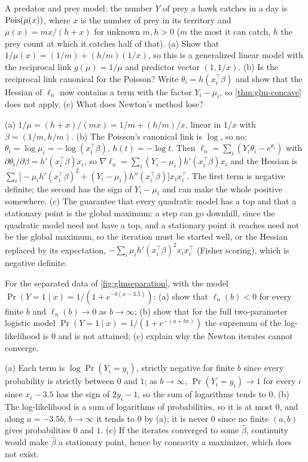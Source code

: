 \begin{exercise}
\label{ex:glm-predator}
A predator and prey model: the number $Y$ of prey a hawk catches in a day is $\text{Pois}(\mu(x))$, where $x$ is the number of prey in its territory and $\mu(x) = mx/(h + x)$ for unknown $m, h > 0$ ($m$ the most it can catch, $h$ the prey count at which it catches half of that). (a) Show that $1/\mu(x) = (1/m) + (h/m)(1/x)$, so this is a generalized linear model with the reciprocal link $g(\mu) = 1/\mu$ and predictor vector $(1, 1/x)$. (b) Is the reciprocal link canonical for the Poisson? Write $\theta_i = h(x_i^\top\beta)$ and show that the Hessian of $\ell_n$ now contains a term with the factor $Y_i - \mu_i$, so \cref{thm:glm-concave} does not apply. (c) What does Newton's method lose?
\end{exercise}
\begin{solution}
(a) $1/\mu = (h + x)/(mx) = 1/m + (h/m)/x$, linear in $1/x$ with $\beta = (1/m, h/m)$. (b) The Poisson's canonical link is $\log$, so no: $\theta_i = \log\mu_i = -\log(x_i^\top\beta)$, $h(t) = -\log t$. Then $\ell_n = \sum_i(Y_i\theta_i - e^{\theta_i})$ with $\partial\theta_i/\partial\beta = h'(x_i^\top\beta)x_i$, so $\nabla\ell_n = \sum_i(Y_i - \mu_i)h'(x_i^\top\beta)x_i$ and the Hessian is $\sum_i\big[-\mu_ih'(x_i^\top\beta)^2 + (Y_i - \mu_i)h''(x_i^\top\beta)\big]x_ix_i^\top$. The first term is negative definite; the second has the sign of $Y_i - \mu_i$ and can make the whole positive somewhere. (c) The guarantee that every quadratic model has a top and that a stationary point is the global maximum: a step can go downhill, since the quadratic model need not have a top, and a stationary point it reaches need not be the global maximum, so the iteration must be started well, or the Hessian replaced by its expectation, $-\sum_i\mu_ih'(x_i^\top\beta)^2x_ix_i^\top$ (Fisher scoring), which is negative definite.
\end{solution}

\begin{exercise}
\label{ex:glm-separation}
For the separated data of \cref{fig:glmseparation}, with the model $\Pr(Y = 1 \mid x) = 1/(1 + e^{-b(x - 3.5)})$: (a) show that $\ell_n(b) < 0$ for every finite $b$ and $\ell_n(b) \to 0$ as $b \to \infty$; (b) show that for the full two-parameter logistic model $\Pr(Y = 1 \mid x) = 1/(1 + e^{-(a + bx)})$ the supremum of the log-likelihood is $0$ and is not attained; (c) explain why the Newton iterates cannot converge.
\end{exercise}
\begin{solution}
(a) Each term is $\log\Pr(Y_i = y_i)$, strictly negative for finite $b$ since every probability is strictly between $0$ and $1$; as $b \to \infty$, $\Pr(Y_i = y_i) \to 1$ for every $i$ since $x_i - 3.5$ has the sign of $2y_i - 1$, so the sum of logarithms tends to $0$. (b) The log-likelihood is a sum of logarithms of probabilities, so it is at most $0$, and along $a = -3.5b$, $b \to \infty$ it tends to $0$ by (a); it is never $0$ since no finite $(a, b)$ gives probabilities $0$ and $1$. (c) If the iterates converged to some $\hat{\beta}$, continuity would make $\hat{\beta}$ a stationary point, hence by concavity a maximizer, which does not exist.
\end{solution}

